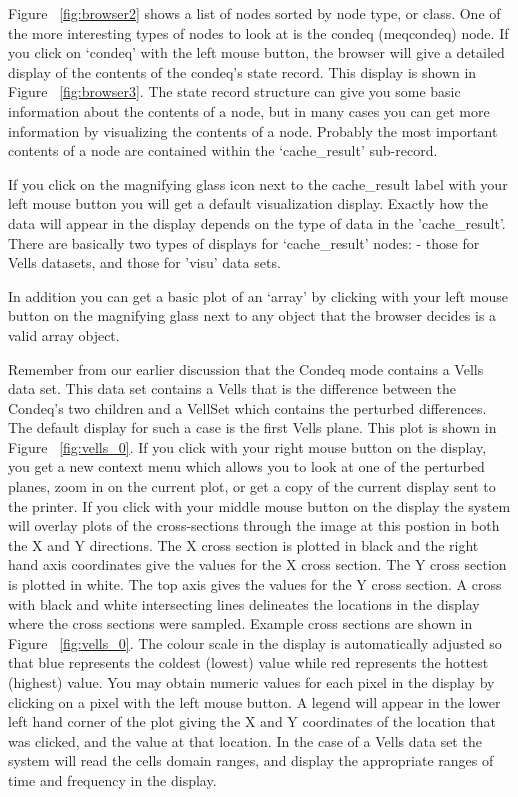 \documentclass[10pt]{article}
\begin{document}
Figure  ~\ref{fig:browser2} shows a list of nodes sorted by node type, or
class. One of the more interesting types of nodes to look at is the 
condeq (meqcondeq) node. If you click on `condeq' with the left mouse
button, the browser will give a detailed display of the contents of the
condeq's state record. This display is shown in Figure ~\ref{fig:browser3}.
The state record structure can give you some basic information about
the contents of a node, but in many cases you can get more information
by visualizing the contents of a node. Probably the most important
contents of a node are contained within the `cache\_result' sub-record.

If you click on the magnifying glass icon next to the cache\_result
label with your left mouse button you will get a default visualization
display. Exactly how the data will appear in the display depends
on the type of data in the 'cache\_result'. 
There are basically
two types of displays for `cache\_result' nodes: - those for Vells datasets, 
and those for 'visu' data sets. 

In addition you can get a basic plot of an `array' by clicking with
your left mouse button on the magnifying glass next to any object that
the browser decides is a valid array object.

Remember from our earlier discussion that the Condeq mode contains
a Vells data set. This data set contains a Vells that is
the difference between the Condeq's two children and a
VellSet which contains the perturbed differences. The default 
display for such a case is the first Vells plane. This plot is
shown in Figure  ~\ref{fig:vells_0}. If you click with your
right mouse button on the display, you get a new context menu
which allows you to look at one of the perturbed planes, zoom
in on the current plot, or get a copy of the current display 
sent to the printer. If you click with your middle mouse button
on the display the system will overlay plots of the cross-sections
through the image at this postion in both the X and Y directions. 
The X cross section is plotted in black and the right hand axis
coordinates give the values for the X cross section. The Y cross
section is plotted in white. The top axis gives the values for the
Y cross section. A cross with black and white intersecting
lines delineates the locations in the display where the cross
sections were sampled. Example cross sections are shown in 
Figure  ~\ref{fig:vells_0}. The colour scale in the display is
automatically adjusted so that blue represents the coldest (lowest)
value while red represents the hottest (highest) value. You may
obtain numeric values for each pixel in the display by clicking
on a pixel with the left mouse button. A legend will appear
in the lower left hand corner of the plot giving the X and Y
coordinates of the location that was clicked, and the value at that
location.  In the case of a Vells data set
the system will read the cells domain ranges, and display the
appropriate ranges of time and frequency in the display.
\end{document}
